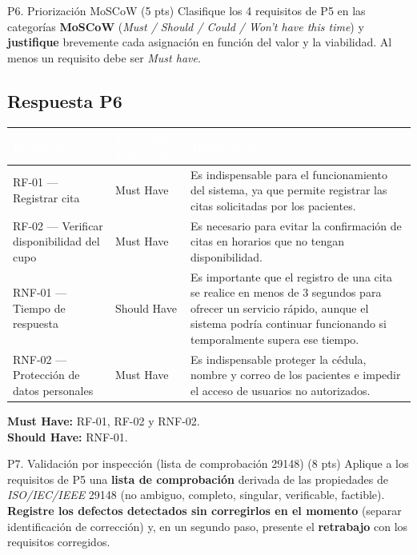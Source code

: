 \documentclass[11pt,a4paper,oneside]{article}
\newcommand{\hd}[1]{\cellcolor{darkblue}\textbf{\textcolor{white}{\small\sffamily #1}}}
\begin{document}
\begin{tarea}{P6. Priorizaci\'on MoSCoW \hfill (5 pts)}
Clasifique los 4 requisitos de P5 en las categor\'ias \textbf{MoSCoW} (\textit{Must / Should / Could / Won't have this time}) y \textbf{justifique} brevemente cada asignaci\'on en funci\'on del valor y la viabilidad. Al menos un requisito debe ser \textit{Must have}.
\end{tarea}

\subsection*{Respuesta P6}
\begin{center}
\small
\begin{tabularx}{\linewidth}{@{}L{3.2cm} C{2.3cm} X@{}}
\toprule
\hd{Requisito} & \hd{Prioridad MoSCoW} & \hd{Justificaci\'on}\\
\midrule
RF-01 --- Registrar cita & Must Have & Es indispensable para el funcionamiento del sistema, ya que permite registrar las citas solicitadas por los pacientes.\\
RF-02 --- Verificar disponibilidad del cupo & Must Have & Es necesario para evitar la confirmaci\'on de citas en horarios que no tengan disponibilidad.\\
RNF-01 --- Tiempo de respuesta & Should Have & Es importante que el registro de una cita se realice en menos de 3 segundos para ofrecer un servicio r\'apido, aunque el sistema podr\'ia continuar funcionando si temporalmente supera ese tiempo.\\
RNF-02 --- Protecci\'on de datos personales & Must Have & Es indispensable proteger la c\'edula, nombre y correo de los pacientes e impedir el acceso de usuarios no autorizados.\\
\bottomrule
\end{tabularx}
\end{center}

\textbf{Must Have:} RF-01, RF-02 y RNF-02.\\
\textbf{Should Have:} RNF-01.

\begin{tarea}{P7. Validaci\'on por inspecci\'on (lista de comprobaci\'on 29148) \hfill (8 pts)}
Aplique a los requisitos de P5 una \textbf{lista de comprobaci\'on} derivada de las propiedades de \textit{ISO/IEC/IEEE} 29148 (no ambiguo, completo, singular, verificable, factible). \textbf{Registre los defectos detectados sin corregirlos en el momento} (separar identificaci\'on de correcci\'on) y, en un segundo paso, presente el \textbf{retrabajo} con los requisitos corregidos.
\end{tarea}
\end{document}
